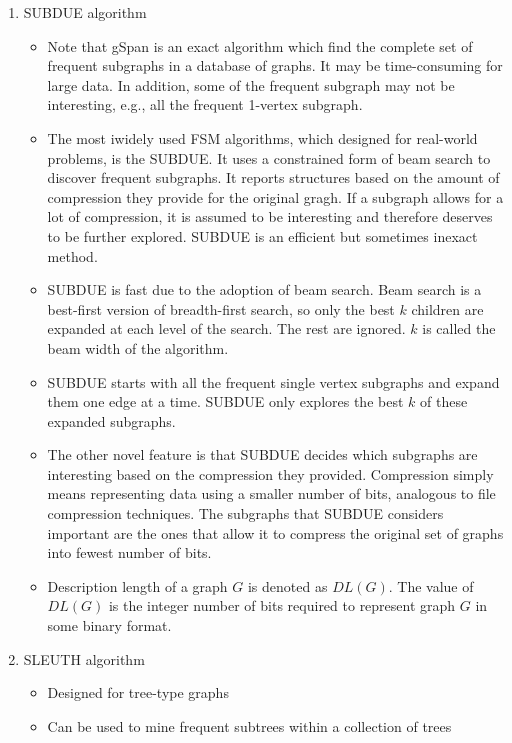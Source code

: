 \documentclass[14pt]{article}
\begin{document}
\begin{enumerate}
 \item SUBDUE algorithm
  \begin{itemize}
   \item Note that gSpan is an exact algorithm which find the complete set of frequent subgraphs in a database of graphs. It may be time-consuming for large data. In addition, some of the frequent subgraph may not be interesting, e.g., all the frequent 1-vertex subgraph.
   \item The most iwidely used FSM algorithms, which designed for real-world problems, is the SUBDUE. It uses a constrained form of beam search to discover frequent subgraphs. It reports structures based on the amount of compression they provide for the original gragh. If a subgraph allows for a lot of compression, it is assumed to be interesting and therefore deserves to be further explored. SUBDUE is an efficient but sometimes inexact method.
   \item SUBDUE is fast due to the adoption of beam search. Beam search is a best-first version of breadth-first search, so only the best $k$ children are expanded at each level of the search. The rest are ignored. $k$ is called the beam width of the algorithm.
   \item SUBDUE starts with all the frequent single vertex subgraphs and expand them one edge at a time. SUBDUE only explores the best $k$ of these expanded subgraphs.
   \item The other novel feature is that SUBDUE decides which subgraphs are interesting based on the compression they provided. Compression simply means representing data using a smaller number of bits, analogous to file compression techniques. The subgraphs that SUBDUE considers important are the ones that allow it to compress the original set of graphs into fewest number of bits.
   \item Description length of a graph $G$ is denoted as $DL(G)$. The value of $DL(G)$ is the integer number of bits required to represent graph $G$ in some binary format. 
  \end{itemize}
  
  \item SLEUTH algorithm
   \begin{itemize}
    \item Designed for tree-type graphs
    \item Can be used to mine frequent subtrees within a collection of trees
   \end{itemize}
\end{enumerate}
\end{document}
